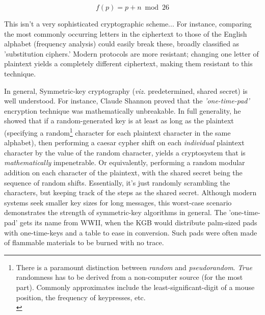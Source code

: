 \documentclass[11pt, a4paper]{report}
\begin{document}
\[
f(p) = p + n \bmod 26 
\]




This isn't a very sophisticated cryptographic scheme... For instance, comparing the most commonly occurring letters in the ciphertext to those of the English alphabet (frequency analysis) could easily break these, broadly classified as 'substitution ciphers.'\autocite[54]{koblitz} 
Modern protocols are more resistant; changing one letter of plaintext yields a completely different ciphertext, making them resistant to this technique.   
  
 In general, Symmetric-key cryptography (\textit{viz.} predetermined, shared secret) is well understood. For instance, Claude Shannon proved that the \textit{'one-time-pad'} encryption technique was mathematically unbreakable. 
In full generality, he showed that if a random-generated key is at least as long as the plaintext (specifying a random\footnote{There is a paramount distinction between \textit{random} and \textit{pseudorandom}. \textit{True} randomness has to be derived from a non-computer source (for the most part). Commonly approximates include the least-significant-digit of a mouse position, the frequency of keypresses, etc.\\\autocite[92]{koblitz}} character for each plaintext character in the same alphabet), then performing a caesar cypher shift on each \textit{individual} plaintext character by the value of the random character, yields a cryptosystem that is \textit{mathematically} impenetrable. 
Or equivalently, performing a random modular addition on each character of the plaintext, with the shared secret being the sequence of random shifts.\autocite{claude} Essentially, it's just randomly scrambling the characters, but keeping track of the steps as the shared secret. %
Although modern systems seek smaller key sizes for long messages, this worst-case scenario demonstrates the strength of symmetric-key algorithms in general. The 'one-time-pad' gets its name from WWII, when the KGB would distribute palm-sized pads with one-time-keys and a table to ease in conversion. Such pads were often made of flammable materials to be burned with no trace.\autocite{lewand} 
  
\end{document}
